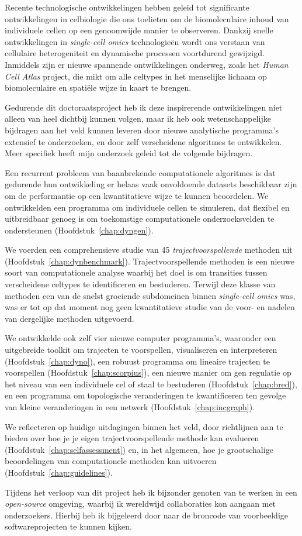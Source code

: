 Recente technologische ontwikkelingen hebben geleid tot significante ontwikkelingen in celbiologie die ons toelieten om de biomoleculaire inhoud van individuele cellen op een genoomwijde manier te observeren. Dankzij snelle ontwikkelingen in \textit{single-cell omics} technologieën wordt ons verstaan van cellulaire heterogeniteit en dynamische processen voortdurend gewijzigd. Inmiddels zijn er nieuwe spannende ontwikkelingen onderweg, zoals het \textit{Human Cell Atlas} project, die mikt om alle celtypes in het menselijke lichaam op biomoleculaire en spatiële wijze in kaart te brengen.

Gedurende dit doctoraatsproject heb ik deze inspirerende ontwikkelingen niet alleen van heel dichtbij kunnen volgen, maar ik heb ook wetenschappelijke bijdragen aan het veld kunnen leveren door nieuwe analytische programma’s extensief te onderzoeken, en door zelf verscheidene algoritmes te ontwikkelen. Meer specifiek heeft mijn onderzoek geleid tot de volgende bijdragen.

Een recurrent probleem van baanbrekende computationele algoritmes is dat gedurende hun ontwikkeling er helaas vaak onvoldoende datasets beschikbaar zijn om de performantie op een kwantitatieve wijze te kunnen beoordelen. We ontwikkelden een programma om individuele cellen te simuleren, dat flexibel en uitbreidbaar genoeg is om toekomstige computationele onderzoeksvelden te ondersteunen (Hoofdstuk~\ref{chap:dyngen}).

We voerden een comprehensieve studie van 45 \textit{trajectvoorspellende} methoden uit (Hoofdstuk~\ref{chap:dynbenchmark}). Trajectvoorspellende methoden is een nieuwe soort van computationele analyse waarbij het doel is om transities tussen verscheidene celtypes te identificeren en bestuderen. Terwijl deze klasse van methoden een van de snelst groeiende subdomeinen binnen \textit{single-cell omics} was, was er tot op dat moment nog geen kwantitatieve studie van de voor- en nadelen van dergelijke methoden uitgevoerd.

We ontwikkelde ook zelf vier nieuwe computer programma's, waaronder een uitgebreide toolkit om trajecten te voorspellen, visualiseren en interpreteren (Hoofdstuk~\ref{chap:dyno}), een robuust programma om lineaire trajecten te voorspellen (Hoofdstuk~\ref{chap:scorpius}), een nieuwe manier om gen regulatie op het niveau van een individuele cel of staal te bestuderen (Hoofdstuk~\ref{chap:bred}), en een programma om topologische veranderingen te kwantificeren ten gevolge van kleine veranderingen in een netwerk (Hoofdstuk~\ref{chap:incgraph}). 

We reflecteren op huidige uitdagingen binnen het veld, door richtlijnen aan te bieden over hoe je je eigen trajectvoorspellende methode kan evalueren (Hoofdstuk~\ref{chap:selfassessment}) en, in het algemeen, hoe je grootschalige beoordelingen van computationele methoden kan uitvoeren (Hoofdstuk~\ref{chap:guidelines}).

Tijdens het verloop van dit project heb ik bijzonder genoten van te werken in een \textit{open-source} omgeving, waarbij ik wereldwijd collaboraties kon aangaan met onderzoekers. Hierbij heb ik bijgeleerd door naar de broncode van voorbeeldige softwareprojecten te kunnen kijken.
